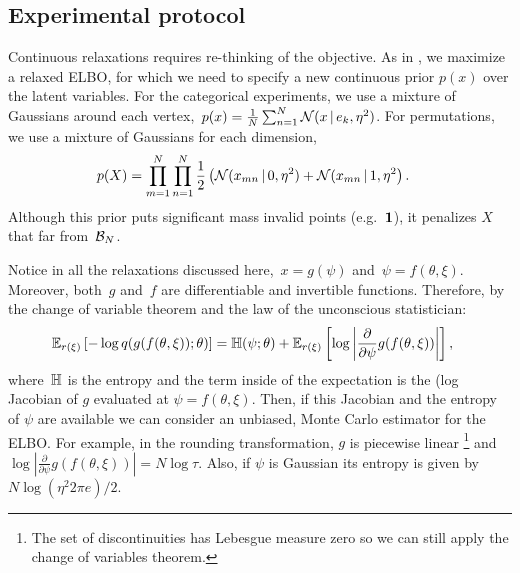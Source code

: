 \subsection{Experimental protocol}
 Continuous relaxations requires
re-thinking of the objective. As in \cite{maddison2016concrete}, we
maximize a relaxed ELBO, for which we need to specify a new continuous
prior $p(x)$ over the latent variables.
For the categorical experiments, we use a mixture of Gaussians around
each vertex,~${p(x) = \tfrac{1}{N} \sum_{n=1}^N \mathcal{N}(x \, | \, e_k, \eta^2)}$. For permutations, we use a mixture of Gaussians for each
dimension,
\begin{align}
  p(X) &= \prod_{m=1}^N \prod_{n=1}^N
  \frac{1}{2} \left(\mathcal{N}(x_{mn} \, | \, 0, \eta^2) + \mathcal{N}(x_{mn} \, | \, 1, \eta^2 \right).
  \end{align}
Although this prior puts significant mass invalid points
(e.g.~$\boldsymbol{1}$), it penalizes $X$ that far from~$\mathcal{B}_N$.

 Notice in all the relaxations
discussed here,~${x = g(\psi)}$ and~${\psi = f(\theta,
  \xi)}$. Moreover, both~$g$ and~$f$ are differentiable and invertible
functions. Therefore, by the change of variable theorem and the law of
the unconscious statistician:
\begin{align}
  \mathbb{E}_{r(\xi)} \left[- \log q(g(f(\theta, \xi)); \theta) \right]
  &= \mathbb{H}(\psi; \theta)+
    \mathbb{E}_{r(\xi)}\left[\log \left|\frac{\partial}{\partial \psi} g(f(\theta, \xi)) \right| \right],
  \end{align}
where~$\mathbb{H}$ is the entropy and the term inside of the expectation
is the (log Jacobian of $g$ evaluated at $\psi =
f(\theta,\xi)$. Then, if this Jacobian and the entropy of $\psi$ are
available we can consider an unbiased, Monte Carlo estimator for the ELBO.
For example, in the rounding transformation, $g$ is piecewise linear
\footnote{The set of discontinuities has Lebesgue measure zero so we
  can still apply the change of variables theorem.} and
$\log | \tfrac{\partial}{\partial \psi} g(f(\theta, \xi)) |= N\log
\tau$. Also, if $\psi$ is Gaussian its entropy is given by
$N\log(\eta^2 2\pi e )/2$.


